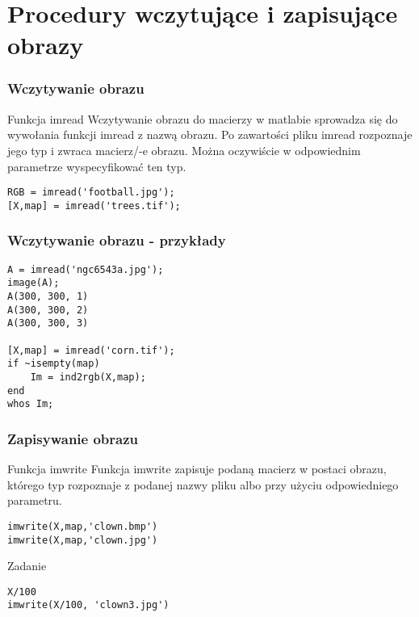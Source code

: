 \documentclass{beamer}
\begin{document}
\section{Procedury wczytujące i zapisujące obrazy}

\begin{frame}[fragile]
\frametitle{Wczytywanie obrazu}
\begin{block}{Funkcja imread}
Wczytywanie obrazu do macierzy w matlabie sprowadza się do wywołania funkcji imread z nazwą obrazu. Po zawartości pliku imread rozpoznaje jego typ i zwraca macierz/-e obrazu. Można oczywiście w odpowiednim parametrze wyspecyfikować ten typ.
\end{block}

\begin{example}
\begin{lstlisting}
RGB = imread('football.jpg');
[X,map] = imread('trees.tif');
\end{lstlisting}
\end{example}

\end{frame}

\begin{frame}[fragile]
\frametitle{Wczytywanie obrazu - przykłady}
\begin{example}
\begin{lstlisting}
A = imread('ngc6543a.jpg');
image(A);
A(300, 300, 1)
A(300, 300, 2)
A(300, 300, 3)

[X,map] = imread('corn.tif');
if ~isempty(map)
    Im = ind2rgb(X,map);
end
whos Im;
\end{lstlisting}
\end{example}

\end{frame}

\begin{frame}[fragile]
\frametitle{Zapisywanie obrazu}
\begin{block}{Funkcja imwrite}
Funkcja imwrite zapisuje podaną macierz w postaci obrazu, którego typ rozpoznaje z podanej nazwy pliku albo przy użyciu odpowiedniego parametru.
\end{block}

\begin{example}
\begin{lstlisting}
imwrite(X,map,'clown.bmp')
imwrite(X,map,'clown.jpg')
\end{lstlisting}
\end{example}

\begin{alertblock}{Zadanie}

\begin{lstlisting}
X/100
imwrite(X/100, 'clown3.jpg')
\end{lstlisting}
\end{alertblock}

\end{frame}
\end{document}
